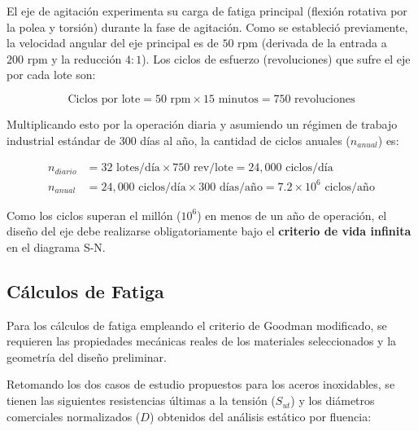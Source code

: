 \documentclass[12pt, a4paper]{article}
\begin{document}
El eje de agitación experimenta su carga de fatiga principal (flexión rotativa por la polea y torsión) durante la fase de agitación. Como se estableció previamente, la velocidad angular del eje principal es de $50 \text{ rpm}$ (derivada de la entrada a $200 \text{ rpm}$ y la reducción $4:1$). Los ciclos de esfuerzo (revoluciones) que sufre el eje por cada lote son:

\begin{equation}
    \text{Ciclos por lote} = 50 \text{ rpm} \times 15 \text{ minutos} = 750 \text{ revoluciones}
\end{equation}

Multiplicando esto por la operación diaria y asumiendo un régimen de trabajo industrial estándar de 300 días al año, la cantidad de ciclos anuales ($n_{anual}$) es:

\begin{align}
    n_{diario} &= 32 \text{ lotes/día} \times 750 \text{ rev/lote} = 24,000 \text{ ciclos/día} \\[6pt]
    n_{anual} &= 24,000 \text{ ciclos/día} \times 300 \text{ días/año} = 7.2 \times 10^6 \text{ ciclos/año}
\end{align}

Como los ciclos superan el millón ($10^6$) en menos de un año de operación, el diseño del eje debe realizarse obligatoriamente bajo el \textbf{criterio de vida infinita} en el diagrama S-N.

\subsection{Cálculos de Fatiga}

Para los cálculos de fatiga empleando el criterio de Goodman modificado, se requieren las propiedades mecánicas reales de los materiales seleccionados y la geometría del diseño preliminar. 

Retomando los dos casos de estudio propuestos para los aceros inoxidables, se tienen las siguientes resistencias últimas a la tensión ($S_{ut}$) y los diámetros comerciales normalizados ($D$) obtenidos del análisis estático por fluencia:
\end{document}
